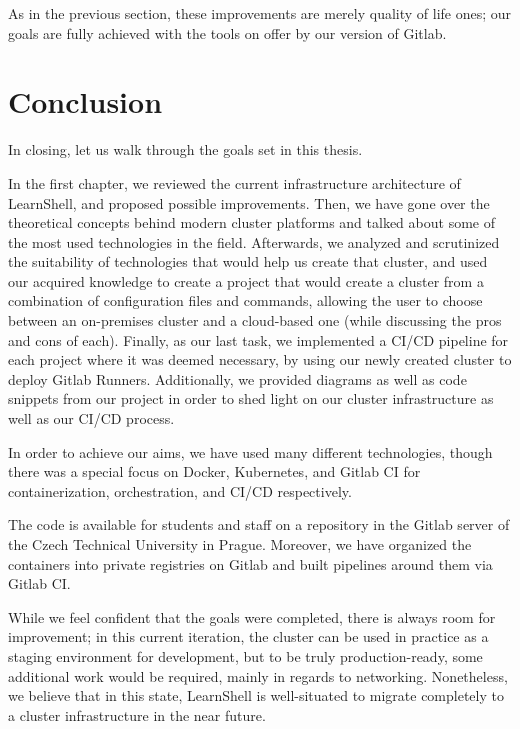 \documentclass[thesis=B,english]{FITthesis}[2019/12/23]
\begin{document}
As in the previous section, these improvements are merely quality of life ones; our goals are fully achieved with the tools on offer by our version of Gitlab.

\chapter{Conclusion}

In closing, let us walk through the goals set in this thesis. 

In the first chapter, we reviewed the current infrastructure architecture of LearnShell, and proposed possible improvements. Then, we have gone over the theoretical concepts behind modern cluster platforms and talked about some of the most used technologies in the field. Afterwards, we analyzed and scrutinized the suitability of technologies that would help us create that cluster, and used our acquired knowledge to create a project that would create a cluster from a combination of configuration files and commands, allowing the user to choose between an on-premises cluster and a cloud-based one (while discussing the pros and cons of each). Finally, as our last task, we implemented a CI/CD pipeline for each project where it was deemed necessary, by using our newly created cluster to deploy Gitlab Runners. Additionally, we provided diagrams as well as code snippets from our project in order to shed light on our cluster infrastructure as well as our CI/CD process. 

In order to achieve our aims, we have used many different technologies, though there was a special focus on Docker, Kubernetes, and Gitlab CI for containerization, orchestration, and CI/CD respectively.

The code is available for students and staff on a repository in the Gitlab server of the Czech Technical University in Prague. Moreover, we have organized the containers into private registries on Gitlab and built pipelines around them via Gitlab CI.

While we feel confident that the goals were completed, there is always room for improvement; in this current iteration, the cluster can be used in practice as a staging environment for development, but to be truly production-ready, some additional work would be required, mainly in regards to networking. Nonetheless, we believe that in this state, LearnShell is well-situated to migrate completely to a cluster infrastructure in the near future.
\end{document}
